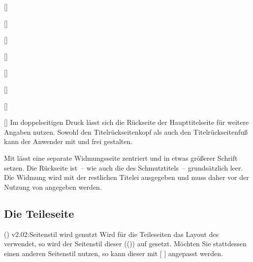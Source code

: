 \begin{Declaration*}{}
\begin{Declaration*}{}
\begin{Declaration*}{}
\begin{Bundle}{}
\begin{Declaration}{[]}
\begin{Declaration}{[]}
\begin{Declaration}{[]}
\begin{Declaration}{[]}
\begin{Declaration}{[]}
\begin{Declaration}{[]}
\begin{Declaration}{[]}
\begin{Declaration}{[]}
%
Im doppelseitigen Druck lässt sich die Rückseite der Haupttitelseite für 
weitere Angaben nutzen. Sowohl den Titelrückseitenkopf als auch den
Titelrückseitenfuß kann der Anwender mit  und 
 frei gestalten.

Mit  lässt eine separate Widmungsseite zentriert und in etwas 
größerer Schrift setzen. Die Rückseite ist~-- wie auch die des Schmutztitels~-- 
grundsätzlich leer. Die Widmung wird mit der restlichen Titelei ausgegeben und 
muss daher vor der Nutzung von  angegeben werden.
%
\end{Declaration}
\end{Declaration}
\end{Declaration}
\end{Declaration}
\end{Declaration}
\end{Declaration}
\end{Declaration}
\end{Declaration}
\end{Bundle}

\subsection{Die Teileseite}
%
%
(){%
  v2.02:Seitenstil  wird genutzt%
}
Wird für die Teileseiten das Layout des \CDs verwendet, so wird der Seitenstil 
dieser (()) auf 
 gesetzt. Möchten Sie stattdessen einen anderen 
Seitenstil nutzen, so kann dieser mit 
[%
]
angepasst werden.


\end{Declaration*}
\end{Declaration*}
\end{Declaration*}
